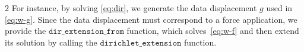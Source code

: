 \documentclass[a4paper, oneside]{article}
\newcommand{\tred}{\textcolor{red}}
\newcommand{\code}[1]{\texttt{#1}}
\begin{document}
\begin{multicols}{2}
For instance, by solving \eqref{eq:dir}, we generate the data displacement $g$ used in \eqref{eq:w-g}.
Since the data displacement must correspond to a force application,
we provide the $\code{dir\_extension\_from}$ function, which
solves~\eqref{eq:w-f} and then extend its solution by calling
the $\code{dirichlet\_extension}$ function.





\end{multicols}
\end{document}

